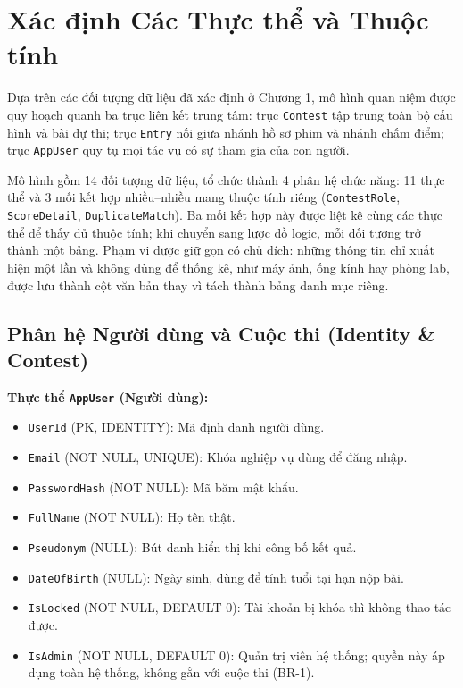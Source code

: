\section{Xác định Các Thực thể và Thuộc tính}

Dựa trên các đối tượng dữ liệu đã xác định ở Chương 1, mô hình quan niệm được quy hoạch quanh ba trục liên kết trung tâm: trục \texttt{Contest} tập trung toàn bộ cấu hình và bài dự thi; trục \texttt{Entry} nối giữa nhánh hồ sơ phim và nhánh chấm điểm; trục \texttt{AppUser} quy tụ mọi tác vụ có sự tham gia của con người.

Mô hình gồm 14 đối tượng dữ liệu, tổ chức thành 4 phân hệ chức năng: 11 thực thể và 3 mối kết hợp nhiều--nhiều mang thuộc tính riêng (\texttt{ContestRole}, \texttt{ScoreDetail}, \texttt{DuplicateMatch}). Ba mối kết hợp này được liệt kê cùng các thực thể để thấy đủ thuộc tính; khi chuyển sang lược đồ logic, mỗi đối tượng trở thành một bảng. Phạm vi được giữ gọn có chủ đích: những thông tin chỉ xuất hiện một lần và không dùng để thống kê, như máy ảnh, ống kính hay phòng lab, được lưu thành cột văn bản thay vì tách thành bảng danh mục riêng.

\subsection{Phân hệ Người dùng và Cuộc thi (Identity \& Contest)}

\noindent\textbf{Thực thể \texttt{AppUser} (Người dùng):}

\begin{itemize}
    \item \texttt{UserId} (PK, IDENTITY): Mã định danh người dùng.
    \item \texttt{Email} (NOT NULL, UNIQUE): Khóa nghiệp vụ dùng để đăng nhập.
    \item \texttt{PasswordHash} (NOT NULL): Mã băm mật khẩu.
    \item \texttt{FullName} (NOT NULL): Họ tên thật.
    \item \texttt{Pseudonym} (NULL): Bút danh hiển thị khi công bố kết quả.
    \item \texttt{DateOfBirth} (NULL): Ngày sinh, dùng để tính tuổi tại hạn nộp bài.
    \item \texttt{IsLocked} (NOT NULL, DEFAULT 0): Tài khoản bị khóa thì không thao tác được.
    \item \texttt{IsAdmin} (NOT NULL, DEFAULT 0): Quản trị viên hệ thống; quyền này áp dụng toàn hệ thống, không gắn với cuộc thi (BR-1).
\end{itemize}

